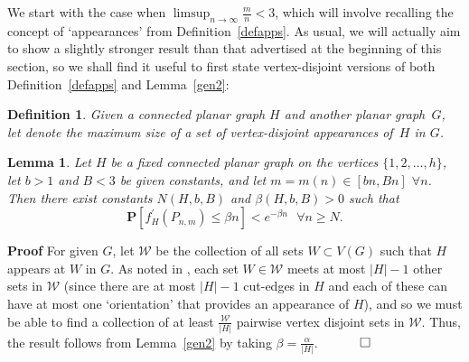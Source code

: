 \documentclass{article}
\newtheorem{Lemma}[Theorem]{Lemma}
\newtheorem{Proof of Theorem}{Proof of Theorem}
\newtheorem{Definition}[Theorem]{Definition}
\begin{document}
We start with the case when $\limsup_{n \to \infty} \frac{m}{n} < 3$,
which will involve recalling the concept of `appearances' from Definition~\ref{defapps}.
As usual,
we will actually aim to show a slightly stronger result than that advertised at the beginning of this section,
so we shall find it useful to first state vertex-disjoint versions of both Definition~\ref{defapps}
and Lemma~\ref{gen2}:















\begin{Definition}
Given a connected planar graph $H$
and another planar graph~$G$,
let \emph{}
denote the maximum size of a set of vertex-disjoint appearances of~$H$ in $G$.
\end{Definition}














\begin{Lemma} \label{gen12}
Let $H$ be a fixed connected planar graph on the vertices $\{1,2, \ldots ,h\}$,
let $b>1$ and $B<3$ be given constants,
and let $m=m(n) \in [bn,Bn]$ $\forall n$.
Then there exist constants $N(H,b,B)$ and $\beta(H,b,B) >0$ such that
\begin{displaymath}
\mathbf{P}[f_{H}^{\prime}(P_{n,m}) \leq \beta n] < e^{- \beta n} \textrm{ } \forall n \geq N.
\end{displaymath}
\end{Lemma}
\textbf{Proof}
For given $G$, let $\mathcal{W}$ be the collection of all sets $W \subset V(G)$ such that $H$ appears at $W$ in $G$.
As noted in \cite{ger}, each set $W \in \mathcal{W}$ meets at most $|H|-1$ other sets in $\mathcal{W}$
(since there are at most $|H|-1$ cut-edges in $H$
and each of these can have at most one `orientation' that provides an appearance of $H$),
and so we must be able to find a collection of at least 
$\frac{\mathcal{W}}{|H|}$ pairwise vertex disjoint sets in $\mathcal{W}$.
Thus, the result follows from Lemma~\ref{gen2} by taking $\beta = \frac{\alpha}{|H|}$.
$\phantom{qwerty}
\setlength{\unitlength}{.25cm}
\begin{picture}(1,1)
\put(0,0){\line(1,0){1}}
\put(0,0){\line(0,1){1}}
\put(1,1){\line(-1,0){1}}
\put(1,1){\line(0,-1){1}}
\end{picture}$ 
\\
\\
\end{document}
